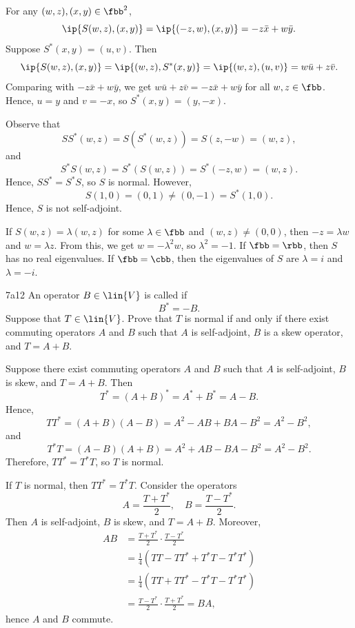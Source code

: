 \begin{solenum}
    \item For any $(w, z), (x, y) \in \fbb^2$,
    \[
        \ip{S(w, z), (x, y)} = \ip{(-z, w), (x, y)} = -z\bar x + w\bar y.
    \]
    Suppose $S^\ast(x, y) = (u, v)$. Then
    \[
        \ip{S(w, z), (x, y)} = \ip{(w, z), S^\ast(x, y)} = \ip{(w, z), (u, v)} = w\bar u + z\bar v.
    \]
    Comparing with $-z\bar x + w\bar y$, we get $w\bar u + z\bar v = -z\bar x + w\bar y$ for all $w, z \in \fbb$.
    Hence, $u = y$ and $v = -x$, so $S^\ast(x, y) = (y, -x)$.
    \item Observe that
    \[
        SS^\ast(w, z) = S(S^\ast(w, z)) = S(z, -w) = (w, z),
    \]
    and
    \[
        S^\ast S(w, z) = S^\ast(S(w, z)) = S^\ast(-z, w) = (w, z).
    \]
    Hence, $SS^\ast = S^\ast S$, so $S$ is normal.
    However,
    \[
        S(1, 0) = (0, 1) \neq (0, -1) = S^\ast(1, 0).
    \]
    Hence, $S$ is not self-adjoint.
    \item If $S(w, z) = \lambda (w, z)$ for some $\lambda \in \fbb$ and $(w, z) \neq (0, 0)$, then $-z = \lambda w$ and $w = \lambda z$.
    From this, we get $w = -\lambda^2 w$, so $\lambda^2 = -1$.
    If $\fbb = \rbb$, then $S$ has no real eigenvalues.
    If $\fbb = \cbb$, then the eigenvalues of $S$ are $\lambda = i$ and $\lambda = -i$.
\end{solenum}

\begin{exercise}{7a12}
    An operator $B \in \lin{V}$ is called  if
    \[
        B^\ast = -B.
    \]
    Suppose that $T \in \lin{V}$.
    Prove that $T$ is normal if and only if there exist commuting operators $A$ and $B$ such that $A$ is self-adjoint, $B$ is a skew operator, and $T = A + B$.
\end{exercise}

\begin{soliff}
    \rightimp Suppose there exist commuting operators $A$ and $B$ such that $A$ is self-adjoint, $B$ is skew, and $T = A + B$.
    Then
    \[
        T^\ast = (A + B)^\ast = A^\ast + B^\ast = A - B.
    \]
    Hence,
    \[
        TT^\ast = (A + B)(A - B) = A^2 - AB + BA - B^2 = A^2 - B^2,
    \]
    and
    \[
        T^\ast T = (A - B)(A + B) = A^2 + AB - BA - B^2 = A^2 - B^2.
    \]
    Therefore, $TT^\ast = T^\ast T$, so $T$ is normal.
    
    \leftimp If $T$ is normal, then $TT^\ast = T^\ast T$.
    Consider the operators
    \[
        A = \frac{T + T^\ast}{2}, \quad B = \frac{T - T^\ast}{2}.
    \]
    Then $A$ is self-adjoint, $B$ is skew, and $T = A + B$.
    Moreover,
    \begin{align*}
        AB &= \frac{T + T^\ast}{2} \cdot \frac{T - T^\ast}{2} \\
        &= \frac{1}{4}(TT - TT^\ast + T^\ast T - T^\ast T^\ast) \\
        &= \frac{1}{4}(TT + TT^\ast - T^\ast T - T^\ast T^\ast) \\
        &= \frac{T - T^\ast}{2} \cdot \frac{T + T^\ast}{2} = BA,
    \end{align*}
    hence $A$ and $B$ commute.
\end{soliff}

